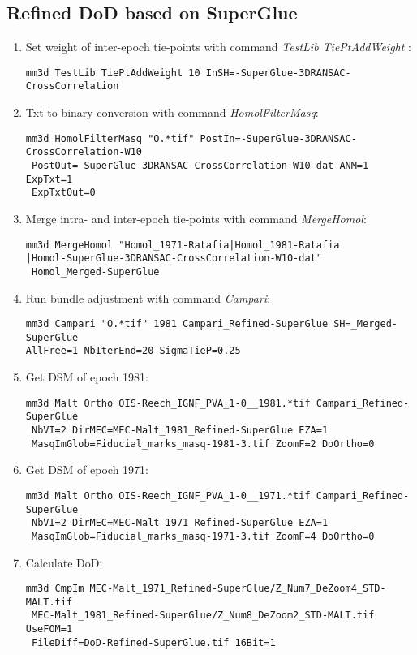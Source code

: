 \subsection{Refined DoD based on SuperGlue}
\begin{enumerate}

\item{Set weight of inter-epoch tie-points with command \textit{TestLib TiePtAddWeight }:}
\begin{verbatim}
mm3d TestLib TiePtAddWeight 10 InSH=-SuperGlue-3DRANSAC-CrossCorrelation
\end{verbatim}
\item{Txt to binary conversion with command \textit{HomolFilterMasq}:}
\begin{verbatim}
mm3d HomolFilterMasq "O.*tif" PostIn=-SuperGlue-3DRANSAC-CrossCorrelation-W10 
 PostOut=-SuperGlue-3DRANSAC-CrossCorrelation-W10-dat ANM=1 ExpTxt=1 
 ExpTxtOut=0
\end{verbatim}
\item{Merge intra- and inter-epoch tie-points with command \textit{MergeHomol}:}
\begin{verbatim}
mm3d MergeHomol "Homol_1971-Ratafia|Homol_1981-Ratafia
|Homol-SuperGlue-3DRANSAC-CrossCorrelation-W10-dat"
 Homol_Merged-SuperGlue
\end{verbatim}
\item{Run bundle adjustment with command \textit{Campari}:}
\begin{verbatim}
mm3d Campari "O.*tif" 1981 Campari_Refined-SuperGlue SH=_Merged-SuperGlue 
AllFree=1 NbIterEnd=20 SigmaTieP=0.25
\end{verbatim}
\item{Get \ac{DSM} of epoch 1981:}
\begin{verbatim}
mm3d Malt Ortho OIS-Reech_IGNF_PVA_1-0__1981.*tif Campari_Refined-SuperGlue
 NbVI=2 DirMEC=MEC-Malt_1981_Refined-SuperGlue EZA=1 
 MasqImGlob=Fiducial_marks_masq-1981-3.tif ZoomF=2 DoOrtho=0
\end{verbatim}
\item{Get \ac{DSM} of epoch 1971:}
\begin{verbatim}
mm3d Malt Ortho OIS-Reech_IGNF_PVA_1-0__1971.*tif Campari_Refined-SuperGlue
 NbVI=2 DirMEC=MEC-Malt_1971_Refined-SuperGlue EZA=1 
 MasqImGlob=Fiducial_marks_masq-1971-3.tif ZoomF=4 DoOrtho=0
\end{verbatim}
\item{Calculate DoD:}
\begin{verbatim}
mm3d CmpIm MEC-Malt_1971_Refined-SuperGlue/Z_Num7_DeZoom4_STD-MALT.tif 
 MEC-Malt_1981_Refined-SuperGlue/Z_Num8_DeZoom2_STD-MALT.tif UseFOM=1 
 FileDiff=DoD-Refined-SuperGlue.tif 16Bit=1
\end{verbatim}
\end{enumerate}

